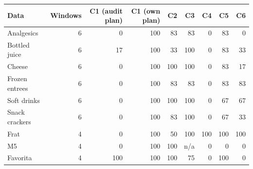 \begin{tabular}{@{}lrrrrrrrr@{}}
\toprule
Data & Windows & C1 (audit plan) & C1 (own plan) & C2 & C3 & C4 & C5 & C6 \\
\midrule
Analgesics & 6 & 0 & 100 & 83 & 83 & 0 & 83 & 0 \\
Bottled juice & 6 & 17 & 100 & 33 & 100 & 0 & 83 & 33 \\
Cheese & 6 & 0 & 100 & 100 & 100 & 0 & 83 & 17 \\
Frozen entrees & 6 & 0 & 100 & 83 & 83 & 0 & 83 & 83 \\
Soft drinks & 6 & 0 & 100 & 100 & 100 & 0 & 67 & 67 \\
Snack crackers & 6 & 0 & 100 & 83 & 100 & 0 & 67 & 33 \\
Frat & 4 & 0 & 100 & 50 & 100 & 100 & 100 & 100 \\
M5 & 4 & 0 & 100 & 100 & n/a & 0 & 0 & 0 \\
Favorita & 4 & 100 & 100 & 100 & 75 & 0 & 100 & 0 \\
\bottomrule
\end{tabular}
